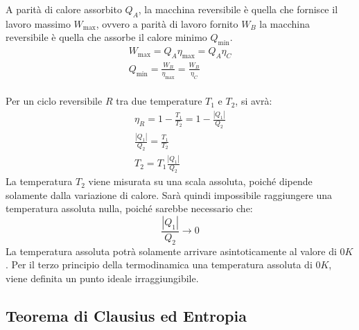 \documentclass{article}
\numberwithin{equation}{subsection}
\begin{document}
A parità di calore assorbito $Q_A$, la macchina reversibile è quella che fornisce il lavoro massimo $W_{\max}$, ovvero a parità di lavoro fornito $W_B$ la macchina reversibile è quella che assorbe 
il calore minimo $Q_{\min}$. 
\begin{gather*}
    W_{\max}=Q_A\eta_{\max}=Q_A\eta_C\\
    Q_{\min}=\displaystyle\frac{W_B}{\eta_{\max}}=\frac{W_B}{\eta_C}
\end{gather*}
\\
Per un ciclo reversibile $R$ tra due temperature $T_1$ e $T_2$, si avrà:
\begin{gather*}
    \eta_R=1-\displaystyle\frac{T_1}{T_2}=1-\displaystyle\frac{|Q_1|}{Q_2}\\
    \displaystyle\frac{|Q_1|}{Q_2}=\frac{T_1}{T_2}\\
    T_2=T_1\displaystyle\frac{|Q_1|}{Q_2}
\end{gather*}
La temperatura $T_2$ viene misurata su una scala assoluta, poiché dipende solamente dalla variazione di calore. Sarà quindi impossibile raggiungere 
una temperatura assoluta nulla, poiché sarebbe 
necessario che: 
\begin{equation*}
    \displaystyle\frac{|Q_1|}{Q_2}\to 0
\end{equation*}
La temperatura assoluta potrà solamente arrivare asintoticamente al valore di $0K$. 
Per il terzo principio della termodinamica una temperatura assoluta di $0K$, viene definita un punto ideale irraggiungibile. 

\subsection{Teorema di Clausius ed Entropia}
\end{document}
